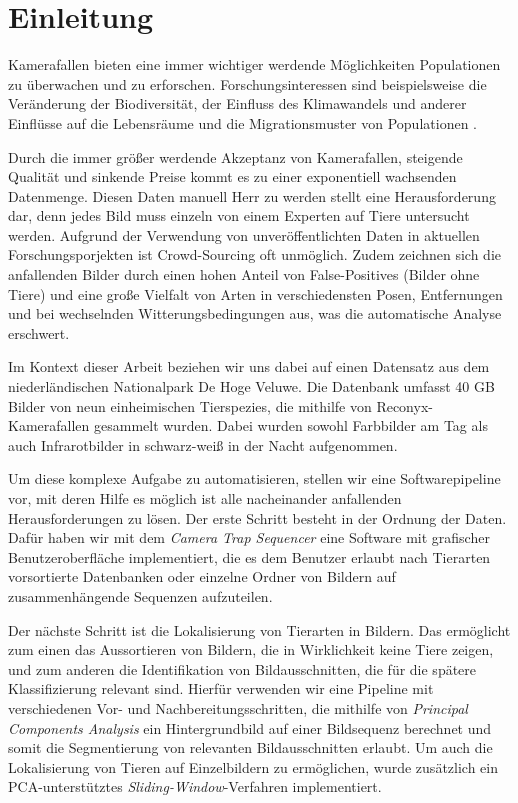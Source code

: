 \newpage
\section{Einleitung}

Kamerafallen bieten eine immer wichtiger werdende Möglichkeiten Populationen zu überwachen und zu erforschen. Forschungsinteressen sind beispielsweise die Veränderung der Biodiversität, der Einfluss des Klimawandels und anderer Einflüsse auf die Lebensräume und die Migrationsmuster von Populationen \cite{ywkjwh13}.

Durch die immer größer werdende Akzeptanz von Kamerafallen, steigende Qualität und sinkende Preise kommt es zu einer exponentiell wachsenden Datenmenge. Diesen Daten manuell Herr zu werden stellt eine Herausforderung dar, denn jedes Bild muss einzeln von einem Experten auf Tiere untersucht werden. Aufgrund der Verwendung von unveröffentlichten Daten in aktuellen Forschungsporjekten ist Crowd-Sourcing oft unmöglich. Zudem zeichnen sich die anfallenden Bilder durch einen hohen Anteil von False-Positives (Bilder ohne Tiere) und eine große Vielfalt von Arten in verschiedensten Posen, Entfernungen und bei wechselnden Witterungsbedingungen aus, was die automatische Analyse erschwert.

Im Kontext dieser Arbeit beziehen wir uns dabei auf einen Datensatz aus dem niederländischen Nationalpark De Hoge Veluwe. Die Datenbank umfasst 40 GB Bilder von neun einheimischen Tierspezies, die mithilfe von Reconyx-Kamerafallen gesammelt wurden. Dabei wurden sowohl Farbbilder am Tag als auch Infrarotbilder in schwarz-weiß in der Nacht aufgenommen.

Um diese komplexe Aufgabe zu automatisieren, stellen wir eine Softwarepipeline vor, mit deren Hilfe es möglich ist alle nacheinander anfallenden Herausforderungen zu lösen. Der erste Schritt besteht in der Ordnung der Daten. Dafür haben wir mit dem \emph{Camera Trap Sequencer} eine Software mit grafischer Benutzeroberfläche implementiert, die es dem Benutzer erlaubt nach Tierarten vorsortierte Datenbanken oder einzelne Ordner von Bildern auf zusammenhängende Sequenzen aufzuteilen.

Der nächste Schritt ist die Lokalisierung von Tierarten in Bildern. Das ermöglicht zum einen das Aussortieren von Bildern, die in Wirklichkeit keine Tiere zeigen, und zum anderen die Identifikation von Bildausschnitten, die für die spätere Klassifizierung relevant sind. Hierfür verwenden wir eine Pipeline mit verschiedenen Vor- und Nachbereitungsschritten, die mithilfe von \emph{Principal Components Analysis} ein Hintergrundbild auf einer Bildsequenz berechnet und somit die Segmentierung von relevanten Bildausschnitten erlaubt. Um auch die Lokalisierung von Tieren auf Einzelbildern zu ermöglichen, wurde zusätzlich ein PCA-unterstütztes \emph{Sliding-Window}-Verfahren implementiert. 

